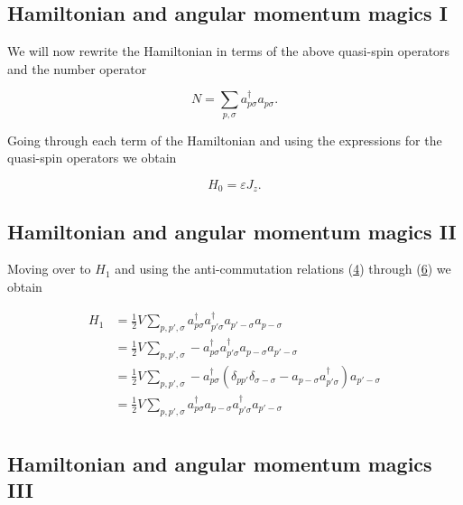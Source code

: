 \documentclass[11pt]{article}
\begin{document}
    \hypertarget{hamiltonian-and-angular-momentum-magics-i}{%
\subsection{Hamiltonian and angular momentum magics
I}\label{hamiltonian-and-angular-momentum-magics-i}}

We will now rewrite the Hamiltonian in terms of the above quasi-spin
operators and the number operator

    \hypertarget{eq:N}{}

\[
\begin{equation}
N = \sum_{p,\sigma} a_{p\sigma}^\dagger a_{p\sigma}.
\label{eq:N} \tag{13}
\end{equation}
\]

    Going through each term of the Hamiltonian and using the expressions for
the quasi-spin operators we obtain

    \hypertarget{eq:H0ny}{}

\[
\begin{equation}
H_0 = \varepsilon J_z.
\label{eq:H0ny} \tag{14}
\end{equation}
\]

    \hypertarget{hamiltonian-and-angular-momentum-magics-ii}{%
\subsection{Hamiltonian and angular momentum magics
II}\label{hamiltonian-and-angular-momentum-magics-ii}}

Moving over to \(H_1\) and using the anti-commutation relations
(\hyperref[eqalak]{4}) through (\hyperref[eqaldak]{6}) we obtain

    \[
\begin{align*}
H_1 &= \frac{1}{2} V \sum_{p,p',\sigma}
a_{p\sigma}^\dagger a_{p'\sigma}^\dagger a_{p'-\sigma} a_{p-\sigma} \\
&= \frac{1}{2} V \sum_{p,p',\sigma}
-a_{p\sigma}^\dagger a_{p'\sigma}^\dagger a_{p-\sigma} a_{p'-\sigma} \\
&= \frac{1}{2} V \sum_{p,p',\sigma}
-a_{p\sigma}^\dagger \left( \delta_{pp'} \delta_{\sigma -\sigma} - a_{p-\sigma} a_{p'\sigma}^\dagger \right) a_{p'-\sigma} \\
&= \frac{1}{2} V \sum_{p,p',\sigma}
a_{p\sigma}^\dagger a_{p-\sigma} a_{p'\sigma}^\dagger a_{p'-\sigma} \\
\end{align*}
\]

    \hypertarget{hamiltonian-and-angular-momentum-magics-iii}{%
\subsection{Hamiltonian and angular momentum magics
III}\label{hamiltonian-and-angular-momentum-magics-iii}}
\end{document}
